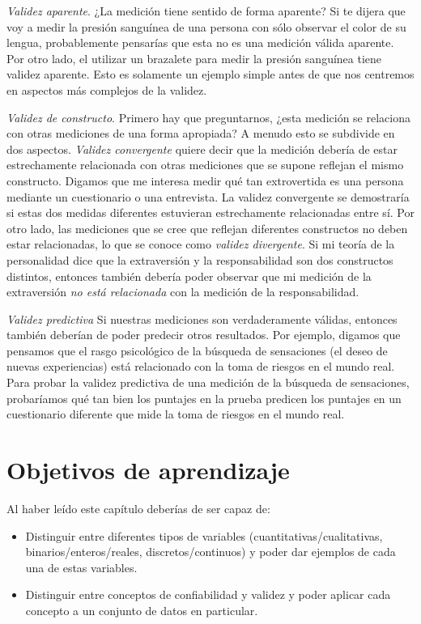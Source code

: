 \documentclass[
  12pt,
]{book}
\providecommand{\tightlist}{%
  \setlength{\itemsep}{0pt}\setlength{\parskip}{0pt}}
\begin{document}
\emph{Validez aparente}. ¿La medición tiene sentido de forma aparente? Si te dijera que voy a medir la presión sanguínea de una persona con sólo observar el color de su lengua, probablemente pensarías que esta no es una medición válida aparente. Por otro lado, el utilizar un brazalete para medir la presión sanguínea tiene validez aparente. Esto es solamente un ejemplo simple antes de que nos centremos en aspectos más complejos de la validez.

\emph{Validez de constructo}. Primero hay que preguntarnos, ¿esta medición se relaciona con otras mediciones de una forma apropiada? A menudo esto se subdivide en dos aspectos. \emph{Validez convergente} quiere decir que la medición debería de estar estrechamente relacionada con otras mediciones que se supone reflejan el mismo constructo. Digamos que me interesa medir qué tan extrovertida es una persona mediante un cuestionario o una entrevista. La validez convergente se demostraría si estas dos medidas diferentes estuvieran estrechamente relacionadas entre sí. Por otro lado, las mediciones que se cree que reflejan diferentes constructos no deben estar relacionadas, lo que se conoce como \emph{validez divergente}. Si mi teoría de la personalidad dice que la extraversión y la responsabilidad son dos constructos distintos, entonces también debería poder observar que mi medición de la extraversión \emph{no está relacionada} con la medición de la responsabilidad.

\emph{Validez predictiva} Si nuestras mediciones son verdaderamente válidas, entonces también deberían de poder predecir otros resultados. Por ejemplo, digamos que pensamos que el rasgo psicológico de la búsqueda de sensaciones (el deseo de nuevas experiencias) está relacionado con la toma de riesgos en el mundo real. Para probar la validez predictiva de una medición de la búsqueda de sensaciones, probaríamos qué tan bien los puntajes en la prueba predicen los puntajes en un cuestionario diferente que mide la toma de riesgos en el mundo real.

\hypertarget{objetivos-de-aprendizaje-1}{%
\section{Objetivos de aprendizaje}\label{objetivos-de-aprendizaje-1}}

Al haber leído este capítulo deberías de ser capaz de:

\begin{itemize}
\tightlist
\item
  Distinguir entre diferentes tipos de variables (cuantitativas/cualitativas, binarios/enteros/reales, discretos/continuos) y poder dar ejemplos de cada una de estas variables.
\item
  Distinguir entre conceptos de confiabilidad y validez y poder aplicar cada concepto a un conjunto de datos en particular.
\end{itemize}
\end{document}
